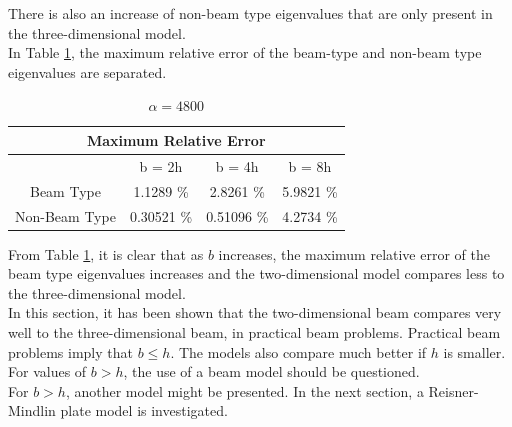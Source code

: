 \documentclass[../../main.tex]{subfiles}
\begin{document}
There is also an increase of non-beam type eigenvalues that are only present in the three-dimensional model.\\

In Table \ref{tab:b>h-split}, the maximum relative error of the beam-type and non-beam type eigenvalues are separated.
\FloatBarrier
\begin{table}[htbp]
	\centering
	\caption{$\alpha = 4800$}
	\begin{tabular}{|c|ccc|}
		\hline
		\multicolumn{4}{|c|}{Maximum Relative Error} \\
		\hline
		\hline
		& {b = 2h} & {b = 4h} & {b = 8h} \\
		\hline
		Beam Type & 1.1289 \% & 2.8261 \% & 5.9821 \% \\
		Non-Beam Type & 0.30521 \% & 0.51096 \% & 4.2734 \% \\
		\hline
	\end{tabular}%
	\label{tab:b>h-split}%
\end{table}%
\FloatBarrier

From Table \ref{tab:b>h-split}, it is clear that as $b$ increases, the maximum relative error of the beam type eigenvalues increases and the two-dimensional model compares less to the three-dimensional model.\\

In this section, it has been shown that the two-dimensional beam compares very well to the three-dimensional beam, in practical beam problems. Practical beam problems imply that $b \leq h$. The models also compare much better if $h$ is smaller. For values of  $b > h$, the use of a beam model should be questioned.\\

For $b > h$, another model might be presented. In the next section, a Reisner-Mindlin plate model is investigated.
\end{document}
